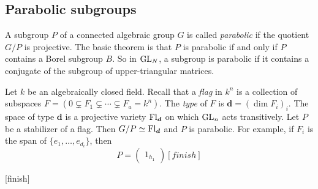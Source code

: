 \subsection{Parabolic subgroups}

A subgroup $P$ of a connected algebraic group $G$ is called \emph{parabolic} if 
the quotient $G/P$ is projective. The basic theorem is that $P$ is parabolic if 
and only if $P$ contains a Borel subgroup $B$. So in $\operatorname{GL}_N$, a 
subgroup is parabolic if it contains a conjugate of the subgroup of 
upper-triangular matrices. 

\begin{example}
Let $k$ be an algebraically closed field. Recall that a \emph{flag} in 
$k^n$ is a collection of subspaces 
$F=(0\subsetneq F_1\subsetneq \cdots \subsetneq F_a=k^n)$. The \emph{type} of 
$F$ is $\boldsymbol d=(\dim F_i)_i$. The space of type $\boldsymbol d$ is a 
projective variety $\operatorname{Fl}_{\boldsymbol d}$ on which $\operatorname{GL}_n$ acts 
transitively. Let $P$ be a stabilizer of a flag. Then 
$G/P\simeq \operatorname{Fl}_{\boldsymbol d}$ and $P$ is parabolic. For example, if 
$F_i$ is the span of $\{e_1,\dots,e_{d_i}\}$, then 
\[
  P = \begin{pmatrix} 1_{h_1} \end{pmatrix} [finish]
\]
\end{example}

[finish]




